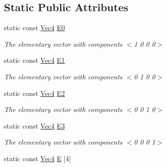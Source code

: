 \subsection*{Static Public Attributes}
\begin{DoxyCompactItemize}
\item 
\hypertarget{classgfxmath_1_1_vec4_abac7a7c5dc05d203efd0b25e4be24103}{}static const \hyperlink{classgfxmath_1_1_vec4}{Vec4} \hyperlink{classgfxmath_1_1_vec4_abac7a7c5dc05d203efd0b25e4be24103}{E0}\label{classgfxmath_1_1_vec4_abac7a7c5dc05d203efd0b25e4be24103}

\begin{DoxyCompactList}\small\item\em The elementary vector with components $<$1 0 0 0$>$ \end{DoxyCompactList}\item 
\hypertarget{classgfxmath_1_1_vec4_af68241e60c037d16fde0793a700033d6}{}static const \hyperlink{classgfxmath_1_1_vec4}{Vec4} \hyperlink{classgfxmath_1_1_vec4_af68241e60c037d16fde0793a700033d6}{E1}\label{classgfxmath_1_1_vec4_af68241e60c037d16fde0793a700033d6}

\begin{DoxyCompactList}\small\item\em The elementary vector with components $<$0 1 0 0$>$ \end{DoxyCompactList}\item 
\hypertarget{classgfxmath_1_1_vec4_a4b1810b7a1acd8c14034c444fcede64f}{}static const \hyperlink{classgfxmath_1_1_vec4}{Vec4} \hyperlink{classgfxmath_1_1_vec4_a4b1810b7a1acd8c14034c444fcede64f}{E2}\label{classgfxmath_1_1_vec4_a4b1810b7a1acd8c14034c444fcede64f}

\begin{DoxyCompactList}\small\item\em The elementary vector with components $<$0 0 1 0$>$ \end{DoxyCompactList}\item 
\hypertarget{classgfxmath_1_1_vec4_a642c1ba01570d0725b992f6109588a99}{}static const \hyperlink{classgfxmath_1_1_vec4}{Vec4} \hyperlink{classgfxmath_1_1_vec4_a642c1ba01570d0725b992f6109588a99}{E3}\label{classgfxmath_1_1_vec4_a642c1ba01570d0725b992f6109588a99}

\begin{DoxyCompactList}\small\item\em The elementary vector with components $<$0 0 0 1$>$ \end{DoxyCompactList}\item 
\hypertarget{classgfxmath_1_1_vec4_aa2a0b9df9b07e6c8a0cf9d0783447e9c}{}static const \hyperlink{classgfxmath_1_1_vec4}{Vec4} \hyperlink{classgfxmath_1_1_vec4_aa2a0b9df9b07e6c8a0cf9d0783447e9c}{E} \mbox{[}4\mbox{]}\label{classgfxmath_1_1_vec4_aa2a0b9df9b07e6c8a0cf9d0783447e9c}


\end{DoxyCompactItemize}
